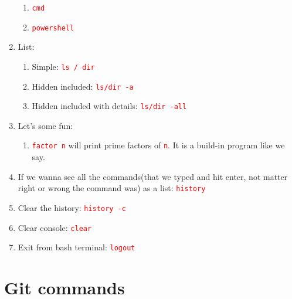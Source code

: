 \documentclass[12 pt, letterpaper]{extarticle}
\newcommand{\R}{\textcolor{red}} %
\newcommand{\T}{\texttt}
\begin{document}
\begin{enumerate}
\begin{enumerate}
			\item \R{\T{cmd}}
			\item \R{\T{powershell}}
		\end{enumerate}
	
	\item List:
		\begin{enumerate}
			\item Simple: \R{\T{ls / dir}}
			\item Hidden included: \R{\T{ls/dir -a}}
			\item Hidden included with details: \R{\T{ls/dir -all}}
		\end{enumerate}
		
	\item Let's some fun:
		\begin{enumerate}
			\item \R{\T{factor n}} will print prime factors of \R{\T{n}}. It is a build-in program like we say.
		\end{enumerate}
	
	\item If we wanna see all the commands(that we typed and hit enter, not matter right or wrong the command was) as a list: \R{\T{history}}
	\item Clear the history: \R{\T{history -c}}
	\item Clear console: \R{\T{clear}}
	\item Exit from bash terminal: \R{\T{logout}}
\end{enumerate}

\section*{Git commands}
\end{document}
